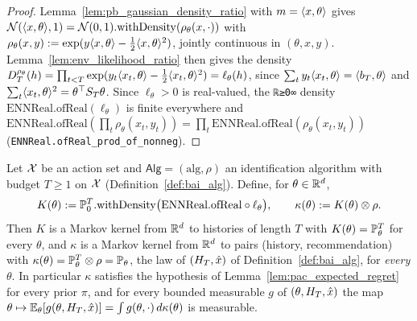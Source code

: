\begin{proof}
\leanok
{}
Lemma~\ref{lem:pb_gaussian_density_ratio} with $m = \langle x, \theta \rangle$ gives
$\mathcal{N}(\langle x, \theta \rangle,1) = \mathcal{N}(0,1).\mathrm{withDensity}(\rho_\theta(x,\cdot))$ with
$\rho_\theta(x,y) := \exp(y\langle x, \theta \rangle-\tfrac12\langle x, \theta \rangle^2)$, jointly continuous in
$(\theta,x,y)$. Lemma~\ref{lem:env_likelihood_ratio} then gives the density
$D_T^{\rho_\theta}(h) = \prod_{t<T}\exp(y_t\langle x_t, \theta \rangle-\tfrac12\langle x_t, \theta \rangle^2) = \ell_\theta(h)$,
since $\sum_ty_t\langle x_t, \theta \rangle = \langle b_T, \theta \rangle$ and
$\sum_t\langle x_t, \theta \rangle^2 = \theta^\top S_T\theta$. Since $\ell_\theta > 0$ is real-valued, the
\texttt{ℝ≥0∞} density $\mathrm{ENNReal.ofReal}(\ell_\theta)$ is finite everywhere and
$\mathrm{ENNReal.ofReal}(\prod_t\rho_\theta(x_t,y_t)) = \prod_t\mathrm{ENNReal.ofReal}(\rho_\theta(x_t,y_t))$
(\texttt{ENNReal.ofReal\_prod\_of\_nonneg}).
\end{proof}

\begin{lemma}\label{lem:pb_kernel_of_likelihood}
\leanok
{}
Let $\mathcal{X}$ be an action set and $\mathsf{Alg} = (\mathrm{alg},\rho)$ an identification algorithm
with budget $T\ge1$ on $\mathcal{X}$ (Definition~\ref{def:bai_alg}). Define, for $\theta\in\mathbb{R}^d$,
\[
  K(\theta) := \mathbb{P}_0^T.\mathrm{withDensity}\big(\mathrm{ENNReal.ofReal}\circ\ell_\theta\big),
  \qquad \kappa(\theta) := K(\theta)\otimes\rho .
\]
Then $K$ is a Markov kernel from $\mathbb{R}^d$ to histories of length $T$ with $K(\theta) = \mathbb{P}_\theta^T$
for every $\theta$, and $\kappa$ is a Markov kernel from $\mathbb{R}^d$ to pairs (history,
recommendation) with $\kappa(\theta) = \mathbb{P}_\theta^T\otimes\rho = \mathbb{P}_\theta$, the law of
$(H_T,\hat{x})$ of Definition~\ref{def:bai_alg}, for \emph{every} $\theta$. In particular
$\kappa$ satisfies the hypothesis of Lemma~\ref{lem:pac_expected_regret} for every prior
$\pi$, and for every bounded measurable $g$ of $(\theta,H_T,\hat{x})$ the map
$\theta\mapsto\mathbb{E}_\theta[g(\theta,H_T,\hat{x})] = \int g(\theta,\cdot)\,d\kappa(\theta)$ is
measurable.
\end{lemma}

